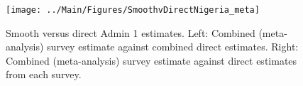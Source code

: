 \documentclass[12pt]{article}\usepackage[]{graphicx}\usepackage[]{color}
\newenvironment{knitrout}{}{} %
\begin{document}



\begin{knitrout}
\color{fgcolor}\begin{figure}[bht]

{\centering \texttt{[image: ../Main/Figures/SmoothvDirectNigeria\_meta]} 

}

\caption[Smooth versus direct Admin 1 estimates]{Smooth versus direct Admin 1 estimates. Left: Combined (meta-analysis) survey estimate against combined direct estimates. Right: Combined (meta-analysis) survey estimate against direct estimates from each survey.}\label{fig:unnamed-chunk-263}
\end{figure}


\end{knitrout}
\end{document}
